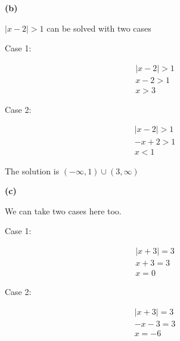 \documentclass[10pt]{article}
\begin{document}
\textbf{(b)}

$|x - 2| > 1$ can be solved with two cases

Case 1: 

\begin{gather*}
  |x - 2| > 1\\
  x - 2 > 1\\
  x > 3
\end{gather*}

Case 2:

\begin{gather*}
  |x - 2| > 1\\
  -x + 2 > 1\\
  x < 1
\end{gather*}

The solution is $(-\infty, 1) \cup (3, \infty)$

\begin{center}
\end{center}

\textbf{(c)}

We can take two cases here too.

Case 1:

\begin{gather*}
  |x + 3| = 3\\
  x + 3 = 3\\
  x = 0
\end{gather*}

Case 2:

\begin{gather*}
  |x + 3| = 3\\
  - x - 3 = 3\\
  x = -6
\end{gather*}
\end{document}
